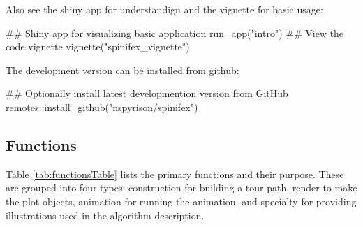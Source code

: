 \noindent Also see the shiny app for understandign and the vignette for
basic usage:

\begin{Schunk}
\begin{Sinput}
## Shiny app for visualizing basic application
run_app("intro")
## View the code vignette
vignette("spinifex_vignette")
\end{Sinput}
\end{Schunk}

\noindent The development version can be installed from github:

\begin{Schunk}
\begin{Sinput}
## Optionally install latest developmention version from GitHub
remotes::install_github("nspyrison/spinifex")
\end{Sinput}
\end{Schunk}

\hypertarget{functions}{%
\subsection{Functions}\label{functions}}

Table \ref{tab:functionsTable} lists the primary functions and their
purpose. These are grouped into four types: construction for building a
tour path, render to make the plot objects, animation for running the
animation, and specialty for providing illustrations used in the
algorithm description.

